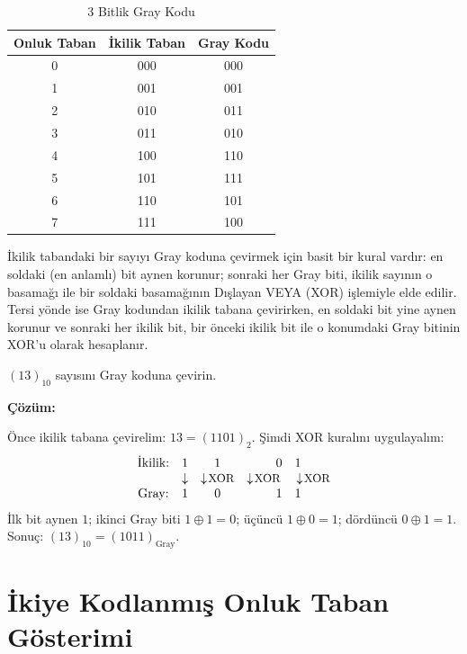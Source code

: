 \begin{table}[H]
\centering
\caption{3 Bitlik Gray Kodu}
\label{tab:gray-kodu}
\begin{tabular}{ccc}
\toprule
\textbf{Onluk Taban} & \textbf{İkilik Taban} & \textbf{Gray Kodu} \\
\midrule
0 & 000 & 000 \\
1 & 001 & 001 \\
2 & 010 & 011 \\
3 & 011 & 010 \\
4 & 100 & 110 \\
5 & 101 & 111 \\
6 & 110 & 101 \\
7 & 111 & 100 \\
\bottomrule
\end{tabular}
\end{table}

İkilik tabandaki bir sayıyı Gray koduna çevirmek için basit bir kural vardır: en soldaki (en anlamlı) bit aynen korunur; sonraki her Gray biti, ikilik sayının o basamağı ile bir soldaki basamağının Dışlayan VEYA (XOR) işlemiyle elde edilir. Tersi yönde ise Gray kodundan ikilik tabana çevirirken, en soldaki bit yine aynen korunur ve sonraki her ikilik bit, bir önceki ikilik bit ile o konumdaki Gray bitinin XOR'u olarak hesaplanır.

\begin{ornek}[A.21]
$(13)_{10}$ sayısını Gray koduna çevirin.

\textbf{Çözüm:}

Önce ikilik tabana çevirelim: $13 = (1101)_2$. Şimdi XOR kuralını uygulayalım:
\[
\begin{array}{cccc}
\text{İkilik:} & 1 & 1 & 0 \quad 1 \\
& \downarrow & \downarrow\!\!\text{\small\,XOR} & \downarrow\!\!\text{\small\,XOR} \quad \downarrow\!\!\text{\small\,XOR} \\
\text{Gray:} & 1 & 0 & 1 \quad 1
\end{array}
\]
İlk bit aynen $1$; ikinci Gray biti $1 \oplus 1 = 0$; üçüncü $1 \oplus 0 = 1$; dördüncü $0 \oplus 1 = 1$. Sonuç: $(13)_{10} = (1011)_{\text{Gray}}$.
\end{ornek}


\section{İkiye Kodlanmış Onluk Taban Gösterimi}
\label{sec:bcd}

